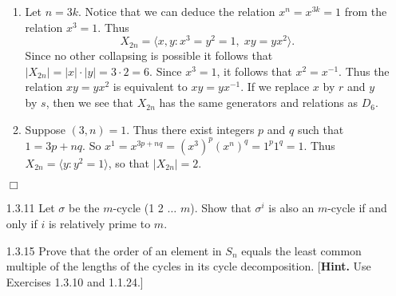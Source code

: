 \documentclass[9pt]{article}
\newcommand{\qed}{\hfill \ensuremath{\Box}}
\newcommand{\cyc}[1]{\langle #1 \rangle}
\begin{document}
\begin{enumerate}
      \begin{enumerate}
         \item Let $n = 3k$. Notice that we can deduce the relation
               $x^n = x^{3k} = 1$ from the relation $x^3 = 1$. Thus
               $$X_{2n} = \cyc{x, y :  x^3 = y^2 = 1, \;xy = yx^2}.$$
               Since no other collapsing is possible it follows that
               $|X_{2n}| = |x| \cdot |y| = 3 \cdot 2 = 6$. Since $x^3 = 1$, it
               follows that $x^2 = x^{-1}$. Thus the relation $xy = yx^2$ is
               equivalent to $xy = yx^{-1}$. If we replace $x$ by $r$ and $y$ by
               $s$, then we see that $X_{2n}$ has the same generators and
               relations as $D_6$.
         \item Suppose $(3, n) = 1$. Thus there exist integers $p$ and $q$ such
               that $1 = 3p + nq$. So
               $x^1 = x^{3p+nq} = (x^3)^p(x^n)^q = 1^p1^q = 1$. Thus
               $X_{2n} = \cyc{y : y^2 = 1}$, so that $|X_{2n}| = 2$.
      \end{enumerate} \qed
   \item[1.3.11]  Let $\sigma$ be the $m$-cycle (1 2 $\ldots$ $m$). Show that
                  $\sigma^i$ is also an $m$-cycle if and only if $i$ is
                  relatively prime to $m$.
   \item[1.3.15]  Prove that the order of an element in $S_n$ equals the least
                  common multiple of the lengths of the cycles in its cycle
                  decomposition.
                  [\textbf{Hint.} Use Exercises 1.3.10 and 1.1.24.]


\end{enumerate}
\end{document}
